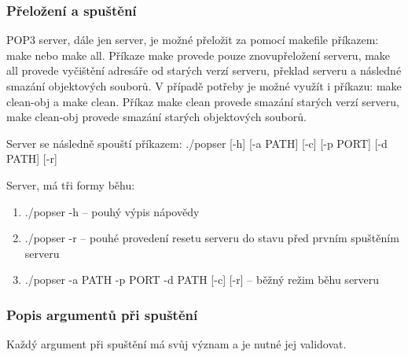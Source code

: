 \documentclass[11pt,a4paper]{report}
\begin{document}
    \subsubsection{Přeložení a spuštění}
    \label{subsec:makeandrun}
    POP3 server, dále jen server, je možné přeložit za pomocí makefile příkazem: make nebo make all. Příkaze make provede pouze znovupřeložení serveru, make all provede vyčištění adresáře od starých verzí serveru, překlad serveru a následné smazání objektových souborů.
    V případě potřeby je možné využít i příkazu: make clean-obj a make clean. Příkaz make clean provede smazání starých verzí serveru, make clean-obj provede smazání starých objektových souborů.\par
    Server se následně spouští příkazem: ./popser [-h] [-a PATH] [-c] [-p PORT] [-d PATH] [-r]\par
    Server, má tři formy běhu:
    \begin{enumerate}
        \item ./popser -h -- pouhý výpis nápovědy
        \item ./popser -r -- pouhé provedení resetu serveru do stavu před prvním spuštěním serveru
        \item ./popser -a PATH -p PORT -d PATH [-c] [-r] -- běžný režim běhu serveru
    \end{enumerate}
    \subsubsection{Popis argumentů při spuštění}
    Každý argument při spuštění má svůj význam a je nutné jej validovat. \par
\end{document}
